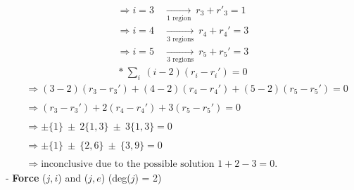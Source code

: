 \documentclass[12pt, letterpaper]{article}
\begin{document}
\begin{align*}
    \Rightarrow i = 3 \ &\xrightarrow[\text{1 region}]{} \ r_3 + r'_{3} = 1 \\
    \Rightarrow i = 4 \ &\xrightarrow[\text{3 regions}]{} \ r_4 + r_4' = 3 \\
    \Rightarrow i = 5 \ &\xrightarrow[\text{3 regions}]{} \ r_5 + r_5' = 3
\end{align*}
\begin{align*}
    * \ \sum _{i} \ (i-2) (r_i - r_i') = 0
\end{align*}
\begin{align*}
    &\Rightarrow (3-2)(r_3 -r_3') + (4-2)(r_4 - r_4') + (5-2)(r_5 - r_5') = 0 \\  \\
    &\Rightarrow (r_3 - r_3') + 2(r_4 - r_4') + 3(r_5 - r_5')= 0 \\ \\
    &\Rightarrow \pm \{1\} \ \pm \ 2\{1, 3\} \ \pm \ 3\{1, 3\} = 0  \\ \\
    &\Rightarrow \pm \{1\} \ \pm \ \{2, 6\} \ \pm \ \{3, 9\} = 0 \\ \\
    &\Rightarrow \text{inconclusive due to the possible solution $1 + 2 - 3 = 0$}.
\end{align*}
- \textbf{Force} ($j,i$) and ($j,e$) (deg($j$) = 2)
\end{document}
